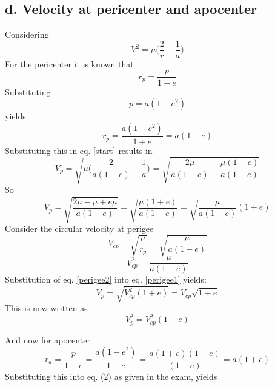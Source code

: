 \subsection{d. Velocity at pericenter and apocenter}
Considering
\begin{equation}
V^2 = \mu \Big(\frac{2}{r}-\frac{1}{a}\Big)
\label{start}
\end{equation}
For the pericenter it is known that
\begin{equation}
r_p = \frac{p}{1+e}
\end{equation}
Substituting
\begin{equation}
p = a (1-e^2)
\end{equation}
yields
\begin{equation}
r_p = \frac{a(1-e^2)}{1+e}=a(1-e)
\end{equation}
Substituting this in eq. \ref{start} results in
\begin{equation}
V_p = \sqrt{\mu \Big( \frac{2}{a(1-e)}-\frac{1}{a} \Big)} = \sqrt{\frac{2\mu}{a(1-e)} - \frac{\mu(1-e)}{a(1-e)}}
\end{equation}
So
\begin{equation}
V_p = \sqrt{\frac{2\mu - \mu + e\mu}{a(1-e)}} = \sqrt{\frac{\mu(1+e)}{a(1-e)}} = \sqrt{\frac{\mu}{a(1-e)}(1+e)}
\label{perigee1}
\end{equation}
Consider the circular velocity at perigee 
\begin{equation}
V_{cp} = \sqrt{\frac{\mu}{r_p}} = \sqrt{\frac{\mu}{a(1-e)}}
\end{equation}
\begin{equation}
V_{cp}^2 = \frac{\mu}{a(1-e)}
\label{perigee2}
\end{equation}
Substitution of eq. \ref{perigee2} into eq. \ref{perigee1} yields:
\begin{equation}
V_p = \sqrt{V_{cp}^2(1+e)} = V_{cp} \sqrt{1+e}
\end{equation}
This is now written as
\begin{equation}
V_p^2 = V_{cp}^2 (1+e)
\end{equation}

\bigskip

And now for apocenter
\begin{equation}
r_a = \frac{p}{1-e} = \frac{a(1-e^2)}{1-e}=\frac{a(1+e)(1-e)}{(1-e)} = a(1+e)
\end{equation}
Substituting this into eq. (2) as given in the exam, yields

